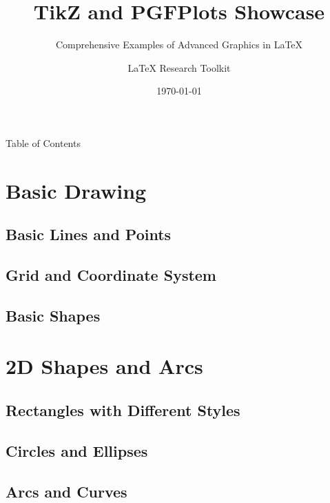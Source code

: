 \documentclass{beamer}
\title{TikZ and PGFPlots Showcase}
\subtitle{Comprehensive Examples of Advanced Graphics in LaTeX}
\author{LaTeX Research Toolkit}
\date{\today}
\begin{document}
\frame{\titlepage}


\begin{frame}{Table of Contents}
\setlength{\columnsep}{0.15cm}
\setlength{\parskip}{0pt}
\setlength{\itemsep}{0pt}
\setlength{\topsep}{0pt}
\setlength{\parsep}{0pt}
\setlength{\partopsep}{0pt}
\begin{multicols}{2}
\tiny
\tableofcontents
\end{multicols}
\end{frame}


\section{Basic Drawing}
\subsection{Basic Lines and Points}

\subsection{Grid and Coordinate System}

\subsection{Basic Shapes}



\section{2D Shapes and Arcs}
\subsection{Rectangles with Different Styles}

\subsection{Circles and Ellipses}

\subsection{Arcs and Curves}

\end{document}
